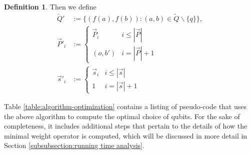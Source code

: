 \documentclass[12pt]{amsbook}
\theoremstyle{plain}
\theoremstyle{definition}
\newtheorem{definition}{Definition}
\theoremstyle{remark}
\newcommand{\lst}{\vec}
\newcommand{\set}{\tilde}
\begin{document}
\begin{definition}
Then we define
$$
\begin{aligned}
\set Q'&:= \{(f(a),f(b)):(a,b)\in\set Q\backslash\{q\}\},\\
\lst P'_i&:=
\begin{cases}
\lst P_i & i \le |\lst P| \\
(o,b') & i = |\lst P|+1
\end{cases} \\
\lst s'_i&:=
\begin{cases}
\lst s_i & i \le |\lst s|\\
1 & i = |\lst s|+1
\end{cases}
\end{aligned}
$$
\end{definition}

Table \ref{table:algorithm-optimization} contains a listing of pseudo-code that uses the above algorithm to compute the optimal choice of qubits.  For the sake of completeness, it includes additional steps that pertain to the details of how the minimal weight operator is computed, which will be discussed in more detail in Section \ref{subsubsection:running time analysis}.
\end{document}
